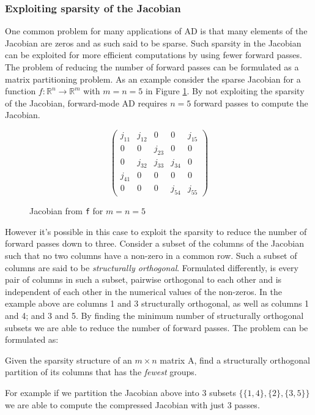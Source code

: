 	\subsubsection{Exploiting sparsity of the Jacobian}
	One common problem for many applications of AD is that many elements of the
	Jacobian
	are zeros and as such said to be sparse. Such sparsity in the Jacobian can
	be exploited for more efficient computations by using fewer forward passes. The
	problem
	of reducing the number of forward passes can be formulated as a matrix
	partitioning problem.
	As an example consider the sparse Jacobian for a function $f: \mathbb{R}^n \to
	\mathbb{R}^m$ with $m=n=5$ in Figure \ref{fig:jacobian}. By not exploiting the
	sparsity of the Jacobian, forward-mode AD requires $n=5$ forward passes to
	compute the Jacobian.
	\begin{figure}[H]
		$$ \left(\begin{matrix}
		j_{11} & j_{12} & 0 & 0 & j_{15} \\
		0 & 0 & j_{23} & 0 & 0 \\
		0 & j_{32} & j_{33} & j_{34} & 0 \\
		j_{41} & 0 & 0 & 0 & 0 \\
		0 & 0 & 0 & j_{54} & j_{55}
		\end{matrix}\right) $$
		\caption{Jacobian from \texttt{f} for $m=n=5$}
		\label{fig:jacobian}
	\end{figure}
	However it's possible in this case to exploit the sparsity to reduce the number
	of forward passes down to three. Consider a subset of the columns of the
	Jacobian such that no two columns have a non-zero in a common row. Such a subset
	of columns are said to be \emph{structurally orthogonal}. Formulated
	differently, is every pair of columns in such a subset, pairwise orthogonal to
	each other and is independent of each other in the numerical values of the
	non-zeros. In the example above are columns 1 and 3 structurally orthogonal, as
	well as columns 1 and 4; and 3 and 5. By finding the minimum number of
	structurally orthogonal subsets we are able to reduce the number of forward
	passes.
	The problem can be formulated as:
	\begin{problem}
		Given the sparsity structure of an $m \times n$ matrix A, find a structurally
		orthogonal partition of its columns that has the \emph{fewest} groups.
		\label{prob:p1}
	\end{problem}
	For example if we partition the Jacobian above into 3 subsets $\{\{1,4\}, \{2\},
	\{3,5\}\}$ we are able to compute the compressed Jacobian with just 3 passes.

